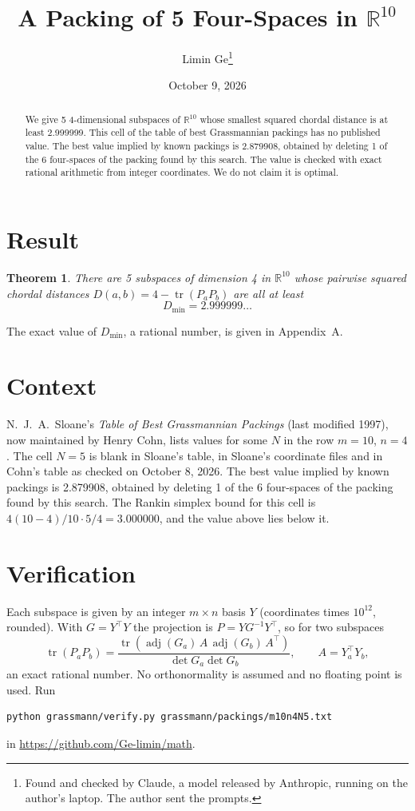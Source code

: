\documentclass[11pt,a4paper]{article}
\title{A Packing of 5 Four-Spaces in $\mathbb{R}^{10}$}
\author{Limin Ge\thanks{Found and checked by Claude, a model released by Anthropic, running on the author's laptop. The author sent the prompts.}}
\date{October 9, 2026}
\newtheorem*{theorem}{Theorem}
\begin{document}
\maketitle
\begin{abstract}
We give 5 4-dimensional subspaces of $\mathbb{R}^{10}$ whose smallest squared chordal distance is at least 2.999999. This cell of the table of best Grassmannian packings has no published value. The best value implied by known packings is 2.879908, obtained by deleting 1 of the 6 four-spaces of the packing found by this search. The value is checked with exact rational arithmetic from integer coordinates. We do not claim it is optimal.
\end{abstract}

\section{Result}
\begin{theorem}
There are 5 subspaces of dimension 4 in $\mathbb{R}^{10}$ whose pairwise squared chordal distances $D(a,b) = 4 - \operatorname{tr}(P_aP_b)$ are all at least
\[ D_{\min} = 2.999999\ldots \]
\end{theorem}
The exact value of $D_{\min}$, a rational number, is given in Appendix~A.


\section{Context}
N.~J.~A.~Sloane's \emph{Table of Best Grassmannian Packings} (last modified 1997), now maintained by Henry Cohn, lists values for some $N$ in the row $m=10$, $n=4$. The cell $N=5$ is blank in Sloane's table, in Sloane's coordinate files and in Cohn's table as checked on October 8, 2026. The best value implied by known packings is 2.879908, obtained by deleting 1 of the 6 four-spaces of the packing found by this search. The Rankin simplex bound for this cell is $4(10-4)/10\cdot 5/4 = 3.000000$, and the value above lies below it.


\section{Verification}
Each subspace is given by an integer $m\times n$ basis $Y$ (coordinates times $10^{12}$, rounded). With $G=Y^\top Y$ the projection is $P=YG^{-1}Y^\top$, so for two subspaces
\[ \operatorname{tr}(P_aP_b)=\frac{\operatorname{tr}(\operatorname{adj}(G_a)\,A\,\operatorname{adj}(G_b)\,A^\top)}{\det G_a\det G_b},\qquad A=Y_a^\top Y_b, \]
an exact rational number. No orthonormality is assumed and no floating point is used. Run
\begin{verbatim}
python grassmann/verify.py grassmann/packings/m10n4N5.txt
\end{verbatim}
in \url{https://github.com/Ge-limin/math}.
\end{document}
